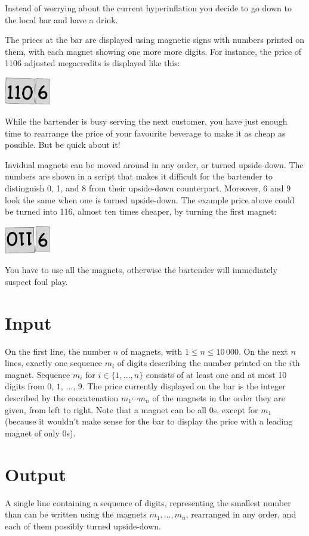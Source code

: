 

Instead of worrying about the current hyperinflation you decide to go down to the local bar and have a drink.

The prices at the bar are displayed using magnetic signs with numbers printed on them, with each magnet showing one more more digits.
For instance, the price of 1106 adjusted megacredits is displayed like this:

\medskip
\includegraphics[width = 2cm]{img/from.png}

While the bartender is busy serving the next customer, you have just enough time to rearrange the price of your favourite beverage to make it as cheap as possible.
But be quick about it!

Invidual magnets can be moved around in any order, or turned upside-down.
The numbers are shown in a script that makes it difficult for the bartender to distinguish 0, 1, and 8 from their upside-down counterpart.
Moreover, 6 and 9 look the same when one is turned upside-down.
The example price above could be turned into 116, almost ten times cheaper, by turning the first magnet:

\medskip
\includegraphics[width = 2cm]{img/to.png}

You have to use all the magnets, otherwise the bartender will immediately suspect foul play.

\section*{Input}

On the first line, the number $n$ of magnets, with $1\leq n\leq 10\,000$.
On the next $n$ lines, exactly one sequence $m_i$ of digits describing the number printed on the $i$th magnet.
Sequence $m_i$ for $i\in \{1,\ldots, n\}$ consists of at least one and at most 10 digits from $0$, $1$, $\ldots$, $9$.
The price currently displayed on the bar is the integer described by the concatenation $m_1\cdots m_n$ of the magnets in the order they are given, from left to right.
Note that a magnet can be all $0$s, except for $m_1$ (because it wouldn't make sense for the bar to display the price with a leading magnet of only $0$s).

\section*{Output}

A single line containing a sequence of digits, representing the smallest number than can be written using the magnets $m_1,\ldots,m_n$, rearranged in any order, and each of them possibly turned upside-down.
